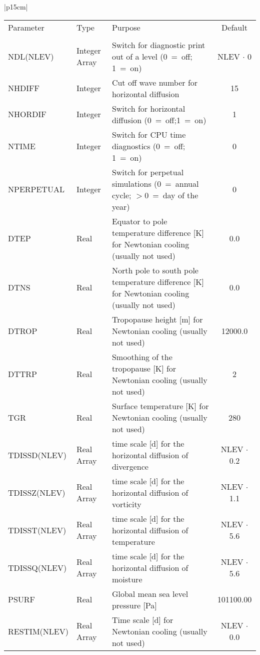 \newpage 

\begin{center}
\begin{tabular}{|p{15cm}|}
\hline
\begin{center}
\begin{tabular}{l l p{5cm} c} %
Parameter & Type & Purpose & Default \\
&&&\\
NDL(NLEV) & Integer Array & Switch for diagnostic print out of a level (0~=~off; 1~=~on)
& NLEV $\cdot$ 0 \\
NHDIFF & Integer & Cut off wave number for horizontal diffusion &  15 \\
NHORDIF & Integer & Switch for horizontal diffusion (0~=~off;1~=~on) &  1 \\
NTIME & Integer & Switch for CPU time diagnostics (0~=~off; 1~=~on) & 0 \\
NPERPETUAL & Integer & Switch for perpetual simulations (0~=~annual cycle;
$>$0~=~day
of the year) & 0 \\
DTEP & Real & Equator to pole temperature difference [K] for Newtonian cooling (usually
not used) & 0.0 \\ 
DTNS & Real & North pole to south pole temperature difference [K] for Newtonian cooling 
(usually not used) & 0.0 \\   
DTROP & Real & Tropopause height [m] for Newtonian cooling (usually not used) &
12000.0 \\  
DTTRP & Real & Smoothing of the tropopause [K] for Newtonian cooling (usually not used)
& 2 \\
TGR & Real & Surface temperature [K] for Newtonian cooling (usually not used) & 280 \\
TDISSD(NLEV) & Real Array & time scale [d] for the horizontal diffusion of divergence&
NLEV $\cdot$ 0.2 \\
 TDISSZ(NLEV) & Real Array & time scale [d] for the horizontal diffusion of vorticity&
NLEV $\cdot$ 1.1 \\
TDISST(NLEV) & Real Array & time scale [d] for the horizontal diffusion of temperature &
NLEV $\cdot$ 5.6 \\
TDISSQ(NLEV) & Real Array & time scale [d] for the horizontal diffusion of moisture&
NLEV $\cdot$ 5.6 \\
PSURF & Real & Global mean sea level pressure [Pa] & 101100.00 \\
RESTIM(NLEV)  & Real Array & Time scale [d] for Newtonian cooling (usually not used)
& NLEV $\cdot$ 0.0 \\
\end{tabular}
\end{center}
\vspace{3mm} \\
\hline
\end{tabular}
\end{center}

